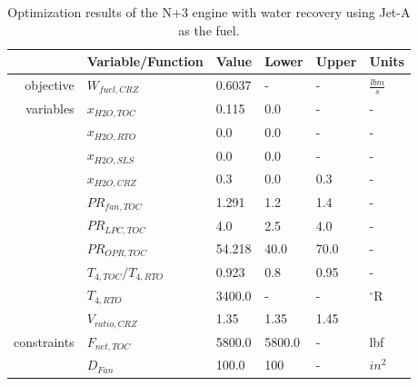 \documentclass[conf]{new-aiaa}
\begin{document}
\begin{table}[hbt!] %
    \centering
    \caption{Optimization results of the N+3 engine with water recovery using Jet-A as the fuel.
    }
    \small
    \renewcommand{\arraystretch}{1.2}
    \begin{tabular}{r l l l l l}
                    & Variable/Function     & Value  & Lower  & Upper & Units           \\
        \toprule
        objective   & $W_{fuel,CRZ}$        & 0.6037 & -      & -     & $\frac{lbm}{s}$ \\
        \hline
        variables   & $x_{H2O,TOC}$         & 0.115  & 0.0    & -     & -               \\
                    & $x_{H2O,RTO}$         & 0.0    & 0.0    & -     & -               \\
                    & $x_{H2O,SLS}$         & 0.0    & 0.0    & -     & -               \\
                    & $x_{H2O,CRZ}$         & 0.3    & 0.0    & 0.3   & -               \\
                    & $PR_{fan,TOC}$        & 1.291  & 1.2    & 1.4   & -               \\
                    & $PR_{LPC,TOC}$        & 4.0    & 2.5    & 4.0   & -               \\
                    & $PR_{OPR,TOC}$        & 54.218 & 40.0   & 70.0  & -               \\
                    & $T_{4,TOC}/T_{4,RTO}$ & 0.923  & 0.8    & 0.95  & -               \\
                    & $T_{4,RTO}$           & 3400.0 & -      & -     & $^\circ$R       \\
                    & $V_{ratio,CRZ}$       & 1.35   & 1.35   & 1.45  &                 \\
        \hline
        constraints & $F_{net,TOC}$         & 5800.0 & 5800.0 & -     & lbf             \\
                    & $D_{Fan}$             & 100.0  & 100    & -     & $in^2$          \\
        \bottomrule
    \end{tabular}
    \label{tab:res_full_opt_JetA}
\end{table}
\end{document}

